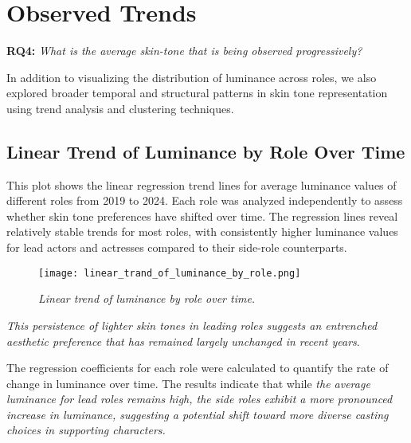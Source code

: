 \section{Observed Trends}
\label{sec:observed-trends}

\textbf{RQ4:} \textit{What is the average skin-tone that is being observed progressively?}

In addition to visualizing the distribution of luminance across roles, we also explored broader temporal and structural patterns in skin tone representation using trend analysis and clustering techniques.

\subsection{Linear Trend of Luminance by Role Over Time}
\label{sec:linear-trend-luminance}
This plot shows the linear regression trend lines for average luminance values of different roles from 2019 to 2024. Each role was analyzed independently to assess whether skin tone preferences have shifted over time. The regression lines reveal relatively stable trends for most roles, with consistently higher luminance values for lead actors and actresses compared to their side-role counterparts.

\begin{figure}[!htpb]
    \centering
    \texttt{[image: linear\_trand\_of\_luminance\_by\_role.png]}
    \caption{\textit{Linear trend of luminance by role over time.}}
    \label{fig: Linear trend of luminance by role}
\end{figure}

\textit{This persistence of lighter skin tones in leading roles suggests an entrenched aesthetic preference that has remained largely unchanged in recent years}.

The regression coefficients for each role were calculated to quantify the rate of change in luminance over time. The results indicate that while \textit{the average luminance for lead roles remains high, the side roles exhibit a more pronounced increase in luminance, suggesting a potential shift toward more diverse casting choices in supporting characters.}

